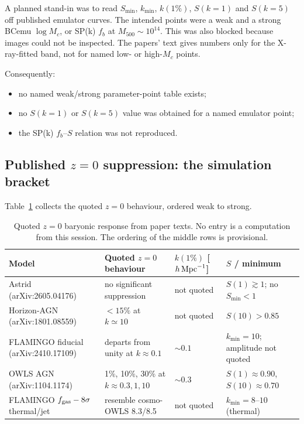 \documentclass[11pt,a4paper]{article}
\begin{document}
A planned stand-in was to read $S_{\min}$, $k_{\min}$, $k(1\%)$, $S(k=1)$ and $S(k=5)$ off published emulator curves. The intended points were a weak and a strong BCemu $\log M_c$, or SP(k) $f_b$ at $M_{500}\sim10^{14}$. This was also blocked because images could not be inspected. The papers' text gives numbers only for the X-ray-fitted band, not for named low- or high-$M_c$ points.

Consequently:
\begin{itemize}
\item no named weak/strong parameter-point table exists;
\item no $S(k=1)$ or $S(k=5)$ value was obtained for a named emulator point;
\item the SP(k) $f_b$--$S$ relation was not reproduced.
\end{itemize}

\subsection{Published $z=0$ suppression: the simulation bracket}
Table~\ref{tab:bracket} collects the quoted $z=0$ behaviour, ordered weak to strong.

\begin{table}
\centering
\begin{tabular}{llll}
\toprule
Model & Quoted $z=0$ behaviour & $k(1\%)$ [$h\,{\rm Mpc}^{-1}$] & $S$ / minimum \\
\midrule
Astrid (arXiv:2605.04176) & no significant suppression & not quoted & $S(1)\gtrsim1$; no $S_{\min}<1$ \\
Horizon-AGN (arXiv:1801.08559) & $<15\%$ at $k\simeq10$ & not quoted & $S(10)>0.85$ \\
FLAMINGO fiducial (arXiv:2410.17109) & departs from unity at $k\approx0.1$ & $\sim0.1$ & $k_{\min}=10$; amplitude not quoted \\
OWLS AGN (arXiv:1104.1174) & 1\%, 10\%, 30\% at $k\approx0.3,1,10$ & $\sim0.3$ & $S(1)\approx0.90$, $S(10)\approx0.70$ \\
FLAMINGO $f_{\rm gas}-8\sigma$ thermal/jet & resemble cosmo-OWLS 8.3/8.5 & not quoted & $k_{\min}=8$--$10$ (thermal) \\
\bottomrule
\end{tabular}
\caption{Quoted $z=0$ baryonic response from paper texts. No entry is a computation from this session. The ordering of the middle rows is provisional.}
\label{tab:bracket}
\end{table}
\end{document}

